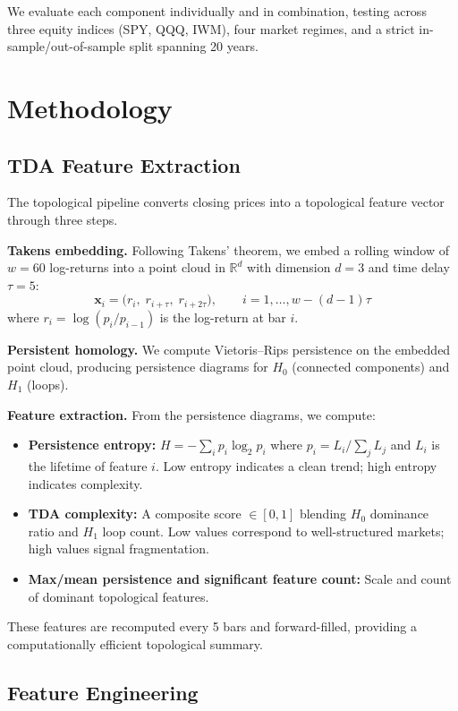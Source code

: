 \documentclass[11pt, a4paper]{article}
\begin{document}
We evaluate each component individually and in combination, testing across three equity indices (SPY, QQQ, IWM), four market regimes, and a strict in-sample/out-of-sample split spanning 20 years.

\section{Methodology}

\subsection{TDA Feature Extraction}

The topological pipeline converts closing prices into a topological feature vector through three steps.

\textbf{Takens embedding.} Following Takens' theorem, we embed a rolling window of $w = 60$ log-returns into a point cloud in $\mathbb{R}^d$ with dimension $d = 3$ and time delay $\tau = 5$:
\[
    \mathbf{x}_i = \bigl(r_i,\; r_{i+\tau},\; r_{i+2\tau}\bigr), \qquad i = 1, \ldots, w - (d-1)\tau
\]
where $r_i = \log(p_i / p_{i-1})$ is the log-return at bar $i$.

\textbf{Persistent homology.} We compute Vietoris--Rips persistence on the embedded point cloud, producing persistence diagrams for $H_0$ (connected components) and $H_1$ (loops).

\textbf{Feature extraction.} From the persistence diagrams, we compute:
\begin{itemize}[nosep]
    \item \textbf{Persistence entropy:} $H = -\sum_i p_i \log_2 p_i$ where $p_i = L_i / \sum_j L_j$ and $L_i$ is the lifetime of feature $i$. Low entropy indicates a clean trend; high entropy indicates complexity.
    \item \textbf{TDA complexity:} A composite score $\in [0, 1]$ blending $H_0$ dominance ratio and $H_1$ loop count. Low values correspond to well-structured markets; high values signal fragmentation.
    \item \textbf{Max/mean persistence and significant feature count:} Scale and count of dominant topological features.
\end{itemize}

These features are recomputed every 5 bars and forward-filled, providing a computationally efficient topological summary.

\subsection{Feature Engineering}
\end{document}
